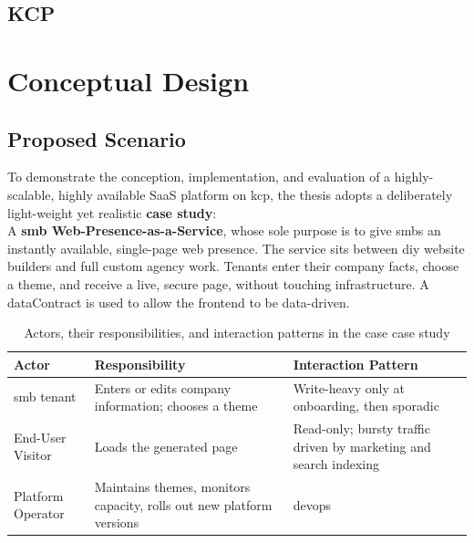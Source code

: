 \documentclass[11pt, a4paper, oneside, listof=totoc]{scrartcl}
\begin{document}
        \subsection{KCP}\label{subsec:relatedKCP}

    \section{Conceptual Design}\label{sec:concept}

        \subsection{Proposed Scenario}\label{subsec:scenario}
            To demonstrate the conception, implementation, and evaluation of a highly-scalable, 
            highly available SaaS platform on \gls{kcp}, the thesis adopts a deliberately
            light-weight yet realistic \textbf{case study}:
            \\
            A \textbf{\gls{smb} Web-Presence-as-a-Service}, whose sole purpose is to give
            \glspl{smb} an instantly available, single-page web presence.
            The service sits between \gls{diy} website builders and full custom agency work.
            Tenants enter their company facts, choose a theme, and receive a live, secure page,
            without touching infrastructure.
            A \gls{dataContract} is used to allow the frontend to be data-driven.
            
            \begin{table}[H]\label{tab:scenario}
                \centering{}
                \renewcommand{\arraystretch}{1.5}
                \begin{tabular}{lP{4cm}P{8cm}}
                    \toprule
                    Actor & Responsibility & Interaction Pattern \\
                    \midrule
                    \gls{smb} tenant & Enters or edits company information; chooses a theme & Write-heavy only at onboarding, then sporadic \\
                    End-User Visitor & Loads the generated page & Read-only; bursty traffic driven by marketing and search indexing \\
                    Platform Operator & Maintains themes, monitors capacity, rolls out new platform versions & \gls{devops} \\
                    \bottomrule
                \end{tabular}
                \caption{Actors, their responsibilities, and interaction patterns in the case case study}
            \end{table}
            
\end{document}
